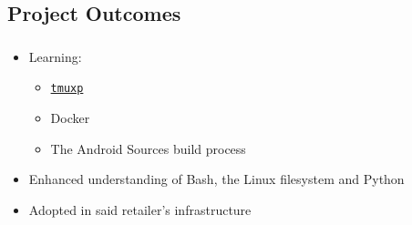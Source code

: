 \documentclass[10pt]{beamer}
\makeatletter
\newcommand*{\currentname}{\@currentlabelname}
\makeatother
\begin{document}
\subsection{Project Outcomes}

\begin{frame}
	\frametitle{\currentname}

	\begin{itemize}
		\item Learning:
			\begin{itemize}
				\item \href{https://pypi.python.org/pypi/tmuxp}{\texttt{tmuxp}}
				\item Docker
				\item The Android Sources build process
			\end{itemize}

		\item Enhanced understanding of Bash, the Linux filesystem and Python
		\item Adopted in said retailer's infrastructure
	\end{itemize}
\end{frame}
\end{document}
